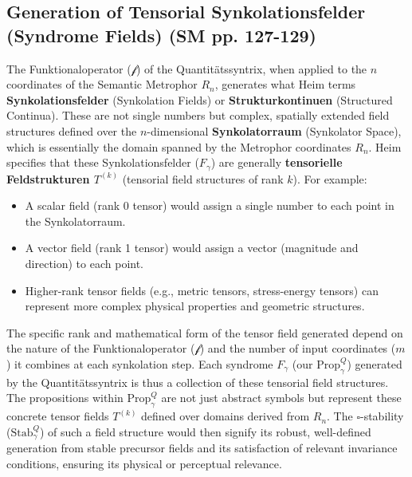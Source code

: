 \documentclass[
    12pt,              %
    a4paper,           %
    headings=normal,   %
    twoside=true,      %
    BCOR=8mm,          %
]{scrbook}
\newcommand{\synkolationsstufe}{m}
\newcommand{\syndrom}{F}
\newcommand{\semantischermetrophor}{R_n}
\newcommand{\funktionaloperator}{\mathcal{f}}
\newcommand{\BoxSyn}{\square}
\begin{document}
\subsection{Generation of Tensorial Synkolationsfelder (Syndrome Fields) (SM pp. 127-129)}
\label{sec:ch7_2_4_tensorial_synkfelder}
The Funktionaloperator (\(\funktionaloperator\)) of the Quantitätssyntrix, when applied to the \(n\) coordinates of the Semantic Metrophor \(\semantischermetrophor\), generates what Heim terms \textbf{Synkolationsfelder} (Synkolation Fields) or \textbf{Strukturkontinuen} (Structured Continua). These are not single numbers but complex, spatially extended field structures defined over the \(n\)-dimensional \textbf{Synkolatorraum} (Synkolator Space), which is essentially the domain spanned by the Metrophor coordinates \(\semantischermetrophor\).
Heim specifies that these Synkolationsfelder (\(\syndrom_\gamma\)) are generally \textbf{tensorielle Feldstrukturen \(T^{(k)}\)} (tensorial field structures of rank \(k\)). For example:
\begin{itemize}
    \item   A scalar field (rank 0 tensor) would assign a single number to each point in the Synkolatorraum.
    \item   A vector field (rank 1 tensor) would assign a vector (magnitude and direction) to each point.
    \item   Higher-rank tensor fields (e.g., metric tensors, stress-energy tensors) can represent more complex physical properties and geometric structures.
\end{itemize}
The specific rank and mathematical form of the tensor field generated depend on the nature of the Funktionaloperator (\(\funktionaloperator\)) and the number of input coordinates (\(\synkolationsstufe\)) it combines at each synkolation step. Each syndrome \(F_\gamma\) (our \(\text{Prop}_\gamma^Q\)) generated by the Quantitätssyntrix is thus a collection of these tensorial field structures. The propositions within \(\text{Prop}_\gamma^Q\) are not just abstract symbols but represent these concrete tensor fields \(T^{(k)}\) defined over domains derived from \(\semantischermetrophor\). The \( \BoxSyn \)-stability (\(\text{Stab}_\gamma^Q\)) of such a field structure would then signify its robust, well-defined generation from stable precursor fields and its satisfaction of relevant invariance conditions, ensuring its physical or perceptual relevance.
\end{document}
